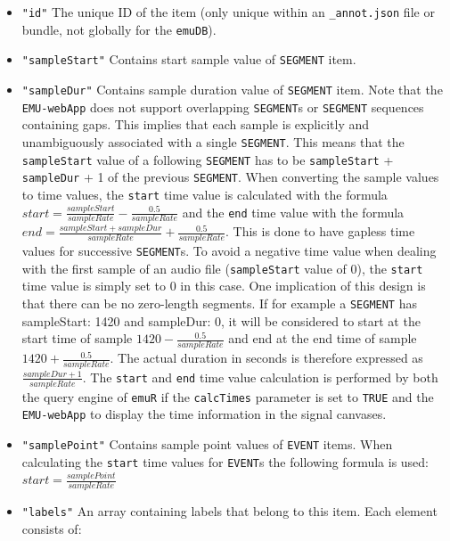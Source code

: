 \documentclass[]{book}
\theoremstyle{definition}
\theoremstyle{definition}
\theoremstyle{definition}
\theoremstyle{remark}
\begin{document}
\begin{itemize}
\begin{itemize}
    \begin{itemize}
    \item
      \texttt{"id"} The unique ID of the item (only unique within an
      \texttt{\_annot.json} file or bundle, not globally for the
      \texttt{emuDB}).
    \item
      \texttt{"sampleStart"} Contains start sample value of
      \texttt{SEGMENT} item.
    \item
      \texttt{"sampleDur"} Contains sample duration value of
      \texttt{SEGMENT} item. Note that the \texttt{EMU-webApp} does not
      support overlapping \texttt{SEGMENT}s or \texttt{SEGMENT}
      sequences containing gaps. This implies that each sample is
      explicitly and unambiguously associated with a single
      \texttt{SEGMENT}. This means that the \texttt{sampleStart} value
      of a following \texttt{SEGMENT} has to be \texttt{sampleStart} +
      \texttt{sampleDur} + 1 of the previous \texttt{SEGMENT}. When
      converting the sample values to time values, the \texttt{start}
      time value is calculated with the formula
      \(start = \frac{sampleStart}{sampleRate} - \frac{0.5}{sampleRate}\)
      and the \texttt{end} time value with the formula
      \(end = \frac{sampleStart + sampleDur}{sampleRate} + \frac{0.5}{ sampleRate}\).
      This is done to have gapless time values for successive
      \texttt{SEGMENT}s. To avoid a negative time value when dealing
      with the first sample of an audio file (\texttt{sampleStart} value
      of \(0\)), the \texttt{start} time value is simply set to \(0\) in
      this case. One implication of this design is that there can be no
      zero-length segments. If for example a \texttt{SEGMENT} has
      sampleStart: 1420 and sampleDur: 0, it will be considered to start
      at the start time of sample \(1420 - \frac{0.5}{sampleRate}\) and
      end at the end time of sample \(1420 + \frac{0.5}{sampleRate}\).
      The actual duration in seconds is therefore expressed as
      \(\frac{sampleDur + 1}{sampleRate}\). The \texttt{start} and
      \texttt{end} time value calculation is performed by both the query
      engine of \texttt{emuR} if the \texttt{calcTimes} parameter is set
      to \texttt{TRUE} and the \texttt{EMU-webApp} to display the time
      information in the signal canvases.
    \item
      \texttt{"samplePoint"} Contains sample point values of
      \texttt{EVENT} items. When calculating the \texttt{start} time
      values for \texttt{EVENT}s the following formula is used:
      \(start = \frac{samplePoint}{sampleRate}\)
    \item
      \texttt{"labels"} An array containing labels that belong to this
      item. Each element consists of:


\end{itemize}
\end{itemize}
\end{itemize}
\end{document}
